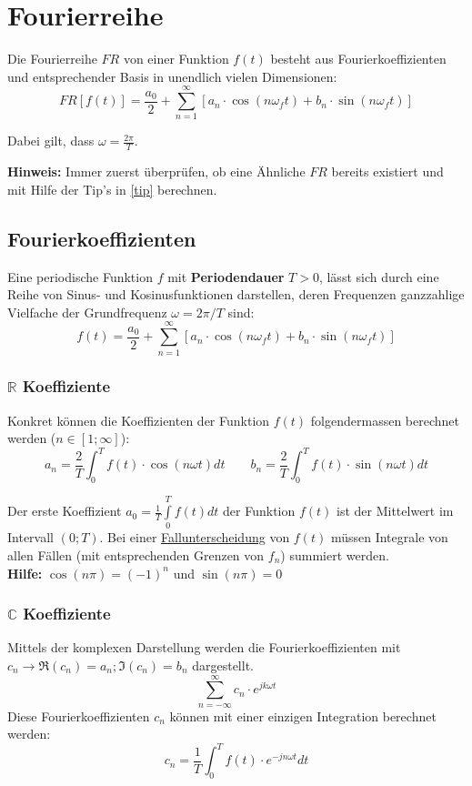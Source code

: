 \section{Fourierreihe}
Die Fourierreihe $FR$ von einer Funktion $f(t)$ besteht aus Fourierkoeffizienten und entsprechender Basis in unendlich vielen Dimensionen:
\[
FR[f(t)] = \frac{a_0}{2} + \sum_{n = 1}^{\infty}[a_n \cdot \cos(n\omega_ft) + b_n \cdot \sin(n\omega_ft)]
\]

\noindent Dabei gilt, dass $\omega = \frac{2\pi}{T}$.

\noindent\textbf{Hinweis:} Immer zuerst überprüfen, ob eine Ähnliche $FR$ bereits existiert und mit Hilfe der Tip's in \ref{tip} berechnen.

\subsection{Fourierkoeffizienten}
Eine periodische Funktion $f$ mit \textbf{Periodendauer} $T > 0$, lässt sich durch eine Reihe von Sinus- und Kosinusfunktionen darstellen, deren Frequenzen ganzzahlige Vielfache der Grundfrequenz $\omega = 2\pi/T$ sind:
\[f(t) = \frac{a_0}{2} + \sum_{n = 1}^{\infty}[a_n \cdot \cos(n\omega_ft) + b_n \cdot \sin(n\omega_ft)]\]
\subsubsection{$\mathbb{R}$ Koeffiziente}
\noindent Konkret können die Koeffizienten der Funktion $f(t)$ folgendermassen berechnet werden ($n \in [1;\infty]$):
\[
a_n = \frac{2}{T}\int_{0}^{T}f(t) \cdot \cos(n\omega t)dt \qquad b_n = \frac{2}{T}\int_{0}^{T}f(t) \cdot \sin(n\omega t)dt
\]

\noindent Der erste Koeffizient $a_0 = \frac{1}{T}\int\limits_{0}^{T}f(t)dt$ der Funktion $f(t)$ ist der Mittelwert im Intervall $(0; T)$. Bei einer \underline{Fallunterscheidung} von $f(t)$ müssen Integrale von allen Fällen (mit entsprechenden Grenzen von $f_n$) summiert werden.
~\\

\noindent\textbf{Hilfe:} $\cos(n\pi) = (-1)^n$ und $\sin(n\pi) = 0$ 
~\\

\subsubsection{$\mathbb{C}$ Koeffiziente}
\noindent Mittels der komplexen Darstellung werden die Fourierkoeffizienten mit $c_n \rightarrow \Re(c_n) = a_n; \Im(c_n) = b_n$ dargestellt.
\[
\sum_{n=-\infty}^{\infty}c_n \cdot e^{jk\omega t}
\]
Diese Fourierkoeffizienten $c_n$ können mit einer einzigen Integration berechnet werden:
\[
c_n = \frac{1}{T} \int_{0}^{T}f(t)\cdot e^{-jn\omega t} dt
\]

